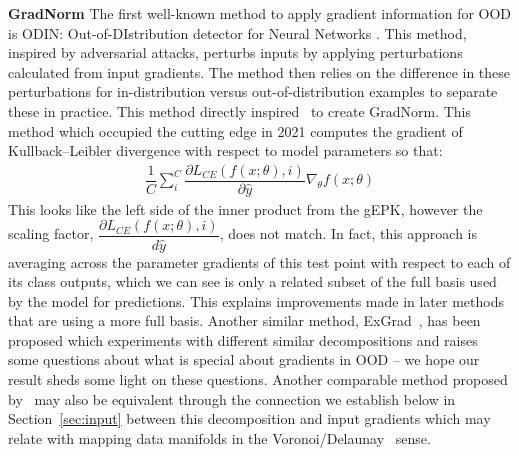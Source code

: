\textbf{GradNorm}
The first well-known method to apply gradient information for OOD is  ODIN: Out-of-DIstribution detector for Neural Networks  \citet{liang2018}. This method, inspired by adversarial attacks, perturbs inputs by applying perturbations calculated from input gradients. The method then relies on the difference in these perturbations for in-distribution versus out-of-distribution examples to separate these in practice. This method directly inspired~\citet{huang2021} to create GradNorm. This method which occupied the cutting edge in 2021 computes the gradient of Kullback–Leibler divergence with respect to model parameters so that:
\begin{align}
    \dfrac{1}{C} \sum_i^C \dfrac{\partial L_{CE}(f(x; \theta), i)}{\partial\hat y}\nabla_\theta f(x; \theta)
\end{align}
This looks like the left side of the inner product from the gEPK, however the scaling factor, $\dfrac{\partial L_{CE}(f(x; \theta), i)}{d\hat y}$, does not match. In fact, this approach is averaging across the parameter gradients of this test point with respect to each of its class outputs, which we can see is only a related subset of the full basis used by the model for predictions. This explains improvements made in later methods that are using a more full basis. Another similar method, ExGrad~\citep{igoe2022}, has been proposed which experiments with different similar decompositions and raises some questions about what is special about gradients in OOD -- we hope our result sheds some light on these questions. Another comparable method proposed by~\citet{sun2022deep} may also be equivalent through the connection we establish below in Section~\ref{sec:input} between this decomposition and input gradients which may relate with mapping data manifolds in the Voronoi/Delaunay~\citep{gillette2022data} sense. 

